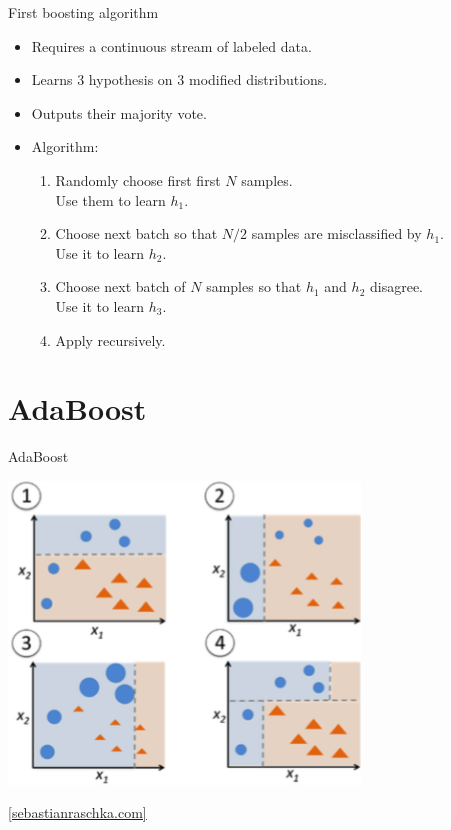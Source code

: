 \documentclass[handout]{beamer}
\newcommand{\hreftextsize}{\footnotesize}
\newcommand{\myhref}[2]{\href{#1}{\hreftextsize #2}}
\begin{document}
\begin{frame}{First boosting algorithm \cite{Schapire1990}}
\begin{itemize}
	\item Requires a continuous stream of labeled data.
	\item Learns 3 hypothesis on 3 modified distributions.
	\item Outputs their majority vote.
	\item Algorithm:
	\begin{enumerate}[<+>]
		\item Randomly choose first first $ N $ samples. \\
		Use them to learn $ h_1 $.
		\item Choose next batch so that $ N/2 $ samples are misclassified by $ h_1 $. \\ Use it to learn $ h_2 $.
		\item Choose next batch of $ N $ samples so that $ h_1 $ and $ h_2 $ disagree.\\
		Use it to learn $ h_3 $.
		\item Apply recursively.
	\end{enumerate}
\end{itemize}
\end{frame}



\section{AdaBoost}
\begin{frame}{AdaBoost}
\begin{center}
	\includegraphics[width=0.7\textwidth]{figs/boosting_cr}

	\myhref{https://sebastianraschka.com/faq/docs/bagging-boosting-rf.html}{[sebastianraschka.com]}
\end{center}
\end{frame}
\end{document}
